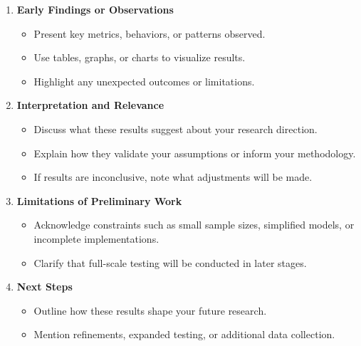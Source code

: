 \documentclass[PCOM,Proposal,Review]{mpThesis}
\newcommand{\Hd}[1]{{\color{SteelBlue}\bf#1}}
\begin{document}
\begin{MainMatter}
\begin{Remark}
\begin{enumerate}
\begin{itemize}
  \item Mention any assumptions or simplifications made for early testing.

  \item Include diagrams, architecture sketches, or pseudocode if relevant.
  \end{itemize}

\item \Hd{Early Findings or Observations}
  \begin{itemize}
  \item Present key metrics, behaviors, or patterns observed.

  \item Use tables, graphs, or charts to visualize results.

  \item Highlight any unexpected outcomes or limitations.
  \end{itemize}

\item \Hd{Interpretation and Relevance}
  \begin{itemize}
  \item Discuss what these results suggest about your research direction.

  \item Explain how they validate your assumptions or inform your methodology.

  \item If results are inconclusive, note what adjustments will be made.
  \end{itemize}

\item \Hd{Limitations of Preliminary Work}
  \begin{itemize}
  \item Acknowledge constraints such as small sample sizes, simplified models, or incomplete implementations.

  \item Clarify that full-scale testing will be conducted in later stages.
  \end{itemize}

\item \Hd{Next Steps}
  \begin{itemize}
  \item Outline how these results shape your future research.

  \item Mention refinements, expanded testing, or additional data collection.
  \end{itemize}
\end{enumerate}
\end{Remark}


\end{MainMatter}
\end{document}
